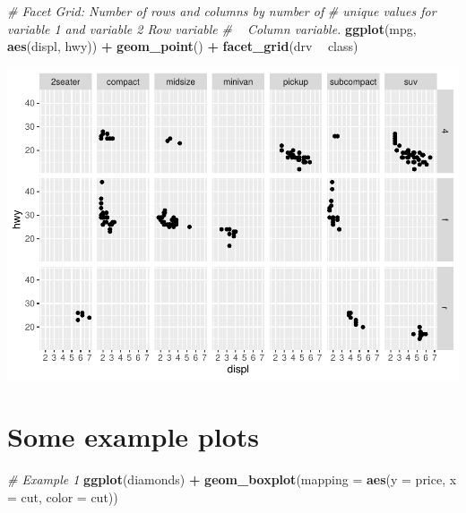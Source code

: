 \documentclass[
]{book}
\newenvironment{Shaded}{\begin{snugshade}}{\end{snugshade}}
\newcommand{\CommentTok}[1]{\textcolor[rgb]{0.56,0.35,0.01}{\textit{#1}}}
\newcommand{\DataTypeTok}[1]{\textcolor[rgb]{0.13,0.29,0.53}{#1}}
\newcommand{\KeywordTok}[1]{\textcolor[rgb]{0.13,0.29,0.53}{\textbf{#1}}}
\newcommand{\NormalTok}[1]{#1}
\newcommand{\OperatorTok}[1]{\textcolor[rgb]{0.81,0.36,0.00}{\textbf{#1}}}
\newcommand{\StringTok}[1]{\textcolor[rgb]{0.31,0.60,0.02}{#1}}
\begin{document}
\begin{Shaded}
\begin{Highlighting}[]
\CommentTok{# Facet Grid: Number of rows and columns by number of}
\CommentTok{# unique values for variable 1 and variable 2 Row variable}
\CommentTok{# ~ Column variable.}
\KeywordTok{ggplot}\NormalTok{(mpg, }\KeywordTok{aes}\NormalTok{(displ, hwy)) }\OperatorTok{+}\StringTok{ }\KeywordTok{geom_point}\NormalTok{() }\OperatorTok{+}\StringTok{ }\KeywordTok{facet_grid}\NormalTok{(drv }\OperatorTok{~}
\StringTok{    }\NormalTok{class)}
\end{Highlighting}
\end{Shaded}

\includegraphics{_main_files/figure-latex/unnamed-chunk-254-2.pdf}

\hypertarget{some-example-plots}{%
\section{Some example plots}\label{some-example-plots}}

\begin{Shaded}
\begin{Highlighting}[]
\CommentTok{# Example 1}
\KeywordTok{ggplot}\NormalTok{(diamonds) }\OperatorTok{+}\StringTok{ }\KeywordTok{geom_boxplot}\NormalTok{(}\DataTypeTok{mapping =} \KeywordTok{aes}\NormalTok{(}\DataTypeTok{y =}\NormalTok{ price, }\DataTypeTok{x =}\NormalTok{ cut,}
    \DataTypeTok{color =}\NormalTok{ cut))}
\end{Highlighting}
\end{Shaded}
\end{document}
